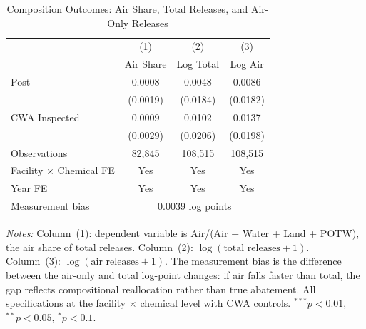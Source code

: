 \begin{table}[htbp]
\centering
\caption{Composition Outcomes: Air Share, Total Releases, and Air-Only Releases}
\label{tab:composition}
\begin{tabular}{lccc}
\toprule
& (1) & (2) & (3) \\
& Air Share & Log Total & Log Air \\
\midrule
Post & 0.0008 & 0.0048 & 0.0086 \\
& (0.0019) & (0.0184) & (0.0182) \\[6pt]
CWA Inspected & 0.0009 & 0.0102 & 0.0137 \\
& (0.0029) & (0.0206) & (0.0198) \\[6pt]
\midrule
Observations & 82,845 & 108,515 & 108,515 \\
Facility $\times$ Chemical FE & Yes & Yes & Yes \\
Year FE & Yes & Yes & Yes \\
Measurement bias & \multicolumn{3}{c}{0.0039 log points} \\
\bottomrule
\end{tabular}
\begin{minipage}{0.95\textwidth}
\vspace{0.3em}
\footnotesize \textit{Notes:} Column~(1): dependent variable is Air/(Air + Water + Land + POTW), the air share of total releases. Column~(2): $\log(\text{total releases} + 1)$. Column~(3): $\log(\text{air releases} + 1)$. The measurement bias is the difference between the air-only and total log-point changes: if air falls faster than total, the gap reflects compositional reallocation rather than true abatement. All specifications at the facility $\times$ chemical level with CWA controls. $^{***}p<0.01$, $^{**}p<0.05$, $^{*}p<0.1$.
\end{minipage}
\end{table}
